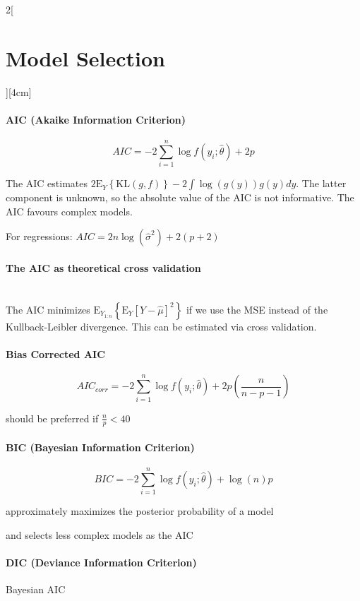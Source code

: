 \documentclass[8pt]{extarticle}
\begin{document}
\begin{multicols}{2}[\section{Model Selection}][4cm]

\paragraph{AIC (Akaike Information Criterion)}

$$AIC = -2\sum_{i=1}^n \log f(y_i;\hat{\theta}) + 2p$$

\noindent The AIC estimates $2\mathrm{E}_{Y}\left\{\mathrm{KL}(g,f)\right\} - 2\int\log(g(y))g(y)dy$. The latter component is unknown, so the absolute value of the AIC is not informative. The AIC favours complex models. 

For regressions: $AIC= 2n\log(\hat{\sigma}^2) + 2(p+2)$

\paragraph{The AIC as theoretical cross validation} \ \\

\noindent The AIC minimizes $\mathrm{E}_{Y_{1:n}}\left\{\mathrm{E}_Y\left[Y-\hat{\mu}\right]^2\right\}$ if we use the MSE instead of the Kullback-Leibler divergence. This can be estimated via cross validation.

\paragraph{Bias Corrected AIC}

$$AIC_{corr} = -2\sum_{i=1}^n \log f(y_i;\hat{\theta}) +2p\left(\frac{n}{n{-}p{-}1}\right)$$

 should be preferred if $\frac{n}{p}<40$
 
\paragraph{BIC (Bayesian Information Criterion)}
 
$$BIC = -2\sum_{i=1}^n \log f(y_i;\hat{\theta}) + \log(n)p$$

\noindent approximately maximizes the posterior probability of a model

and selects less complex models as the AIC

\paragraph{DIC (Deviance Information Criterion)} Bayesian AIC


\end{multicols}
\end{document}
